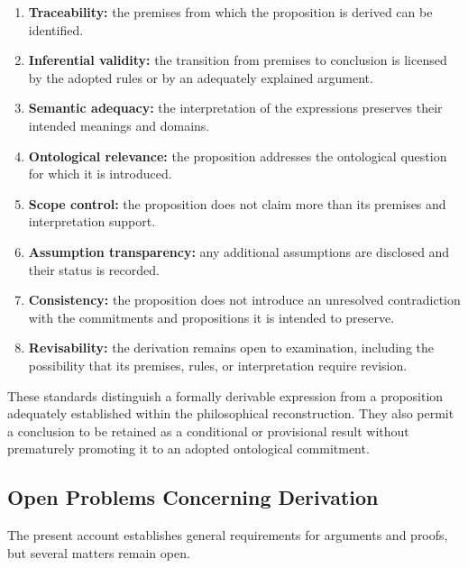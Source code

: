 \begin{enumerate}
    \item \textbf{Traceability:} the premises from which the
    proposition is derived can be identified.

    \item \textbf{Inferential validity:} the transition from
    premises to conclusion is licensed by the adopted rules
    or by an adequately explained argument.

    \item \textbf{Semantic adequacy:} the interpretation of the
    expressions preserves their intended meanings and domains.

    \item \textbf{Ontological relevance:} the proposition addresses
    the ontological question for which it is introduced.

    \item \textbf{Scope control:} the proposition does not claim
    more than its premises and interpretation support.

    \item \textbf{Assumption transparency:} any additional
    assumptions are disclosed and their status is recorded.

    \item \textbf{Consistency:} the proposition does not introduce
    an unresolved contradiction with the commitments and
    propositions it is intended to preserve.

    \item \textbf{Revisability:} the derivation remains open to
    examination, including the possibility that its premises,
    rules, or interpretation require revision.
\end{enumerate}

These standards distinguish a formally derivable expression from
a proposition adequately established within the philosophical
reconstruction. They also permit a conclusion to be retained
as a conditional or provisional result without prematurely
promoting it to an adopted ontological commitment.

\subsection{Open Problems Concerning Derivation}

The present account establishes general requirements for
arguments and proofs, but several matters remain open.

